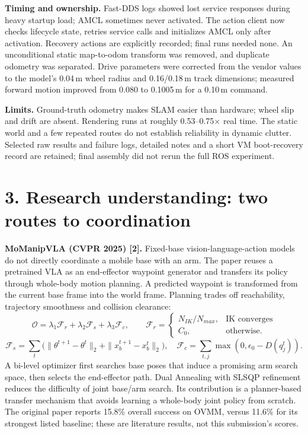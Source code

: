 \documentclass[10pt,a4paper]{article}
\begin{document}
\textbf{Timing and ownership.} Fast-DDS logs showed lost service responses during heavy startup load; AMCL sometimes never activated. The action client now checks lifecycle state, retries service calls and initializes AMCL only after activation. Recovery actions are explicitly recorded; final runs needed none. An unconditional static map-to-odom transform was removed, and duplicate odometry was separated. Drive parameters were corrected from the vendor values to the model's 0.04\,m wheel radius and 0.16/0.18\,m track dimensions; measured forward motion improved from 0.080 to 0.1005\,m for a 0.10\,m command.

\textbf{Limits.} Ground-truth odometry makes SLAM easier than hardware; wheel slip and drift are absent. Rendering runs at roughly 0.53--0.75$\times$ real time. The static world and a few repeated routes do not establish reliability in dynamic clutter. Selected raw results and failure logs, detailed notes and a short VM boot-recovery record are retained; final assembly did not rerun the full ROS experiment.

\clearpage
\section*{3. Research understanding: two routes to coordination}
\textbf{MoManipVLA (CVPR 2025) [2].} Fixed-base vision-language-action models do not directly coordinate a mobile base with an arm. The paper reuses a pretrained VLA as an end-effector waypoint generator and transfers its policy through whole-body motion planning. A predicted waypoint is transformed from the current base frame into the world frame. Planning trades off reachability, trajectory smoothness and collision clearance:
\[
\mathcal O=\lambda_1\mathcal F_r+\lambda_2\mathcal F_s+\lambda_3\mathcal F_c,\qquad
\mathcal F_r=\begin{cases}N_{IK}/N_{max},&\text{IK converges}\\C_0,&\text{otherwise.}\end{cases}
\]
\[
\mathcal F_s=\sum_t\bigl(\|\theta^{t+1}-\theta^t\|_2+\|x_b^{t+1}-x_b^t\|_2\bigr),\quad
\mathcal F_c=\sum_{t,j}\max(0,\epsilon_0-D(q_j^t)).
\]
A bi-level optimizer first searches base poses that induce a promising arm search space, then selects the end-effector path. Dual Annealing with SLSQP refinement reduces the difficulty of joint base/arm search. Its contribution is a planner-based transfer mechanism that avoids learning a whole-body joint policy from scratch. The original paper reports 15.8\% overall success on OVMM, versus 11.6\% for its strongest listed baseline; these are literature results, not this submission's scores.
\end{document}
